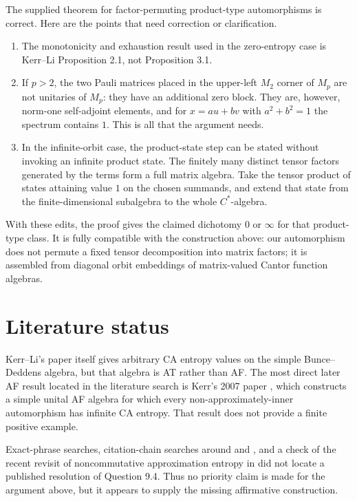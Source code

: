 \documentclass[11pt]{article}
\theoremstyle{remark}
\begin{document}
The supplied theorem for factor-permuting product-type automorphisms is
correct.  Here are the points that need correction or clarification.

\begin{enumerate}[label=(\arabic*)]
\item The monotonicity and exhaustion result used in the zero-entropy case is
Kerr--Li Proposition 2.1, not Proposition 3.1.

\item If $p>2$, the two Pauli matrices placed in the upper-left $M_2$ corner
of $M_p$ are not unitaries of $M_p$: they have an additional zero block.
They are, however, norm-one self-adjoint elements, and for
$x=au+bv$ with $a^2+b^2=1$ the spectrum contains $1$.  This is all that the
argument needs.

\item In the infinite-orbit case, the product-state step can be stated
without invoking an infinite product state.  The finitely many distinct
tensor factors generated by the terms form a full matrix algebra.  Take the
tensor product of states attaining value $1$ on the chosen summands, and
extend that state from the finite-dimensional subalgebra to the whole
$C^*$-algebra.
\end{enumerate}

With these edits, the proof gives the claimed dichotomy $0$ or $\infty$ for
that product-type class.  It is fully compatible with the construction
above: our automorphism does not permute a fixed tensor decomposition into
matrix factors; it is assembled from diagonal orbit embeddings of
matrix-valued Cantor function algebras.

\section{Literature status}

Kerr--Li's paper itself gives arbitrary CA entropy values on the simple
Bunce--Deddens algebra, but that algebra is AT rather than AF.  The most
direct later AF result located in the literature search is Kerr's 2007
paper \cite{KerrAF}, which constructs a simple unital AF algebra for which
every non-approximately-inner automorphism has infinite CA entropy.  That
result does not provide a finite positive example.

Exact-phrase searches, citation-chain searches around \cite{KerrLi} and
\cite{KerrAF}, and a check of the recent revisit of noncommutative
approximation entropy in \cite{JacelonNeagu} did not locate a published
resolution of Question 9.4.  Thus no priority claim is made for the argument
above, but it appears to supply the missing affirmative construction.
\end{document}
